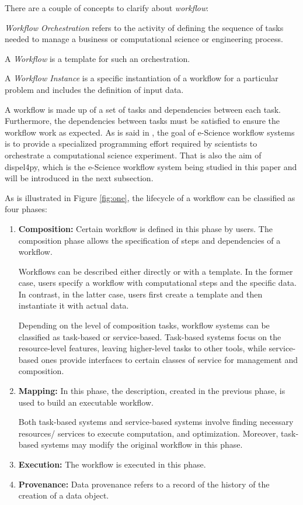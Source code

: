\documentclass[10pt,twoside,openright,logo]{report}
\begin{document}
There are a couple of concepts to clarify about \textit{workflow}:

\textit{Workflow Orchestration} refers to the activity of defining the sequence of tasks needed to manage a business or computational science or engineering process.

A \textit{Workflow} is a template for such an orchestration.

A \textit{Workflow Instance} is a specific instantiation of a workflow for a particular problem and includes the definition of input data.

A workflow is made up of a set of tasks and dependencies between each task. Furthermore, the dependencies between tasks must be satisfied to ensure the workflow work as expected. As is said in \cite{4}, the goal of e-Science workflow systems is to provide a specialized programming effort required by scientists to orchestrate a computational science experiment. That is also the aim of dispel4py, which is the e-Science workflow system being studied in this paper and will be introduced in the next subsection.

As is illustrated in Figure \ref{fig:one}, the lifecycle of a workflow can be classified as four phases:
\begin{enumerate}
    \item \textbf{Composition:}
    Certain workflow is defined in this phase by users. The composition phase allows the specification of steps and dependencies of a workflow.

    Workflows can be described either directly or with a template. In the former case, users specify a workflow with computational steps and the specific data. In contrast, in the latter case, users first create a template and then instantiate it with actual data.

    Depending on the level of composition tasks, workflow systems can be classified as task-based or service-based. Task-based systems focus on the resource-level features, leaving higher-level tasks to other tools, while service-based ones provide interfaces to certain classes of service for management and composition.

    \item \textbf{Mapping:}
    In this phase, the description, created in the previous phase, is used to build an executable workflow.

    Both task-based systems and service-based systems involve finding necessary resources/ services to execute computation, and optimization. Moreover, task-based systems may modify the original workflow in this phase.

    \item \textbf{Execution:}
    The workflow is executed in this phase.

    \item \textbf{Provenance:}
    Data provenance refers to a record of the history of the creation of a data object.

\end{enumerate}
\end{document}
